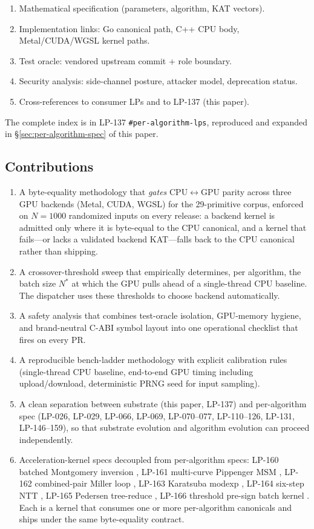 \begin{enumerate}
\item Mathematical specification (parameters, algorithm, KAT vectors).
\item Implementation links: Go canonical path, C++ CPU body, Metal/CUDA/WGSL kernel paths.
\item Test oracle: vendored upstream commit + role boundary.
\item Security analysis: side-channel posture, attacker model, deprecation status.
\item Cross-references to consumer LPs and to LP-137 (this paper).
\end{enumerate}

The complete index is in LP-137 \texttt{\#per-algorithm-lps}, reproduced and expanded in \S\ref{sec:per-algorithm-spec} of this paper.

\subsection{Contributions}

\begin{enumerate}
\item A byte-equality methodology that \emph{gates} CPU$\leftrightarrow$GPU parity across three GPU backends (Metal, CUDA, WGSL) for the 29-primitive corpus, enforced on $N{=}1000$ randomized inputs on every release: a backend kernel is admitted only where it is byte-equal to the CPU canonical, and a kernel that fails---or lacks a validated backend KAT---falls back to the CPU canonical rather than shipping.
\item A crossover-threshold sweep that empirically determines, per algorithm, the batch size $N^{*}$ at which the GPU pulls ahead of a single-thread CPU baseline. The dispatcher uses these thresholds to choose backend automatically.
\item A safety analysis that combines test-oracle isolation, GPU-memory hygiene, and brand-neutral C-ABI symbol layout into one operational checklist that fires on every PR.
\item A reproducible bench-ladder methodology with explicit calibration rules (single-thread CPU baseline, end-to-end GPU timing including upload/download, deterministic PRNG seed for input sampling).
\item A clean separation between substrate (this paper, LP-137) and per-algorithm spec (LP-026, LP-029, LP-066, LP-069, LP-070--077, LP-110--126, LP-131, LP-146--159), so that substrate evolution and algorithm evolution can proceed independently.
\item Acceleration-kernel specs decoupled from per-algorithm specs: LP-160 batched Montgomery inversion \cite{lp160}, LP-161 multi-curve Pippenger MSM \cite{lp161}, LP-162 combined-pair Miller loop \cite{lp162}, LP-163 Karatsuba modexp \cite{lp163}, LP-164 six-step NTT \cite{lp164}, LP-165 Pedersen tree-reduce \cite{lp165}, LP-166 threshold pre-sign batch kernel \cite{lp166}. Each is a kernel that consumes one or more per-algorithm canonicals and ships under the same byte-equality contract.
\end{enumerate}

